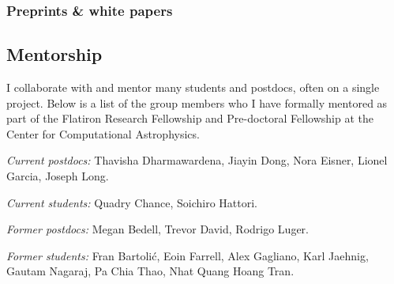 \documentclass[12pt,letterpaper]{article}
\begin{document}
  \subsubsection{Preprints \& white papers}
  \begin{list}{}{\cvlist}
    
  \end{list}
\fi

\subsection{Mentorship}

I collaborate with and mentor many students and postdocs, often on a single
project.
Below is a list of the group members who I have formally mentored as part of the
Flatiron Research Fellowship and Pre-doctoral Fellowship at the Center for
Computational Astrophysics.

\begin{list}{}{\cvlist}
\item \emph{Current postdocs:}
  Thavisha Dharmawardena,
  Jiayin Dong,
  Nora Eisner,
  Lionel Garcia,
  Joseph Long.
\item \emph{Current students:}
  Quadry Chance,
  Soichiro Hattori.
\item \emph{Former postdocs:}
  Megan Bedell,
  Trevor David,
  Rodrigo Luger.
\item \emph{Former students:}
  Fran Bartoli\'c,
  Eoin Farrell,
  Alex Gagliano,
  Karl Jaehnig,
  Gautam Nagaraj,
  Pa Chia Thao,
  Nhat Quang Hoang Tran.
\end{list}
\end{document}
